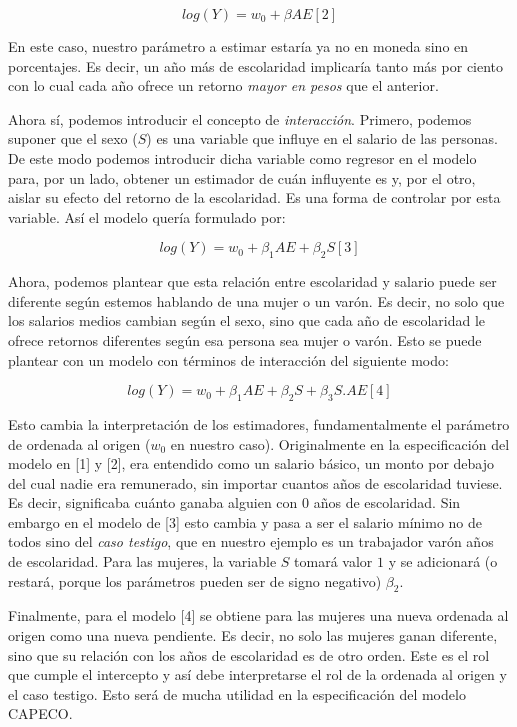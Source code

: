 $$log(Y) = w_0 + \beta AE [2]$$

En este caso, nuestro parámetro a estimar estaría ya no en moneda sino en porcentajes. Es decir, un año más de escolaridad implicaría tanto más por ciento con lo cual cada año ofrece un retorno \textit{mayor en pesos} que el anterior.




Ahora sí, podemos introducir el concepto de \textit{interacción}. Primero, podemos suponer que el sexo ($S$) es una variable que influye en el salario de las personas. De este modo podemos introducir dicha variable como regresor en el modelo para, por un lado, obtener un estimador de cuán influyente es y, por el otro, aislar su efecto del retorno de la escolaridad. Es una forma de controlar por esta variable. Así el modelo quería formulado por:
 
$$log(Y) = w_0 + \beta_1 AE + \beta_2 S [3]$$



Ahora, podemos plantear que esta relación entre escolaridad y salario puede ser diferente según estemos hablando de una mujer o un varón. Es decir, no solo que los salarios medios cambian según el sexo, sino que cada año de escolaridad le ofrece retornos diferentes según esa persona sea mujer o varón. Esto se puede plantear con un modelo con términos de interacción del siguiente modo:

$$log(Y) = w_0 + \beta_1 AE + \beta_2 S + \beta_3  S.AE [4] $$



Esto cambia la interpretación de los estimadores, fundamentalmente el parámetro de ordenada al origen ($w_0$ en nuestro caso). Originalmente en la especificación del modelo en [1] y [2], era entendido como un salario básico, un monto por debajo del cual nadie era remunerado, sin importar cuantos años de escolaridad tuviese. Es decir, significaba cuánto ganaba alguien con 0 años de escolaridad. Sin embargo en el modelo  de [3] esto cambia y pasa a ser el salario mínimo no de todos sino del \textit{caso testigo}, que en nuestro ejemplo es un trabajador varón años de escolaridad. Para las mujeres, la variable $S$ tomará valor $1$ y se adicionará (o restará, porque los parámetros pueden ser de signo negativo) $\beta_2$. 

Finalmente, para el modelo [4] se obtiene para las mujeres una nueva ordenada al origen como una nueva pendiente. Es decir, no solo las mujeres ganan diferente, sino que su relación con los años de escolaridad es de otro orden. Este es el rol que cumple el intercepto y así debe interpretarse el rol de la ordenada al origen y el caso testigo. Esto será de mucha utilidad en la especificación del modelo CAPECO.

